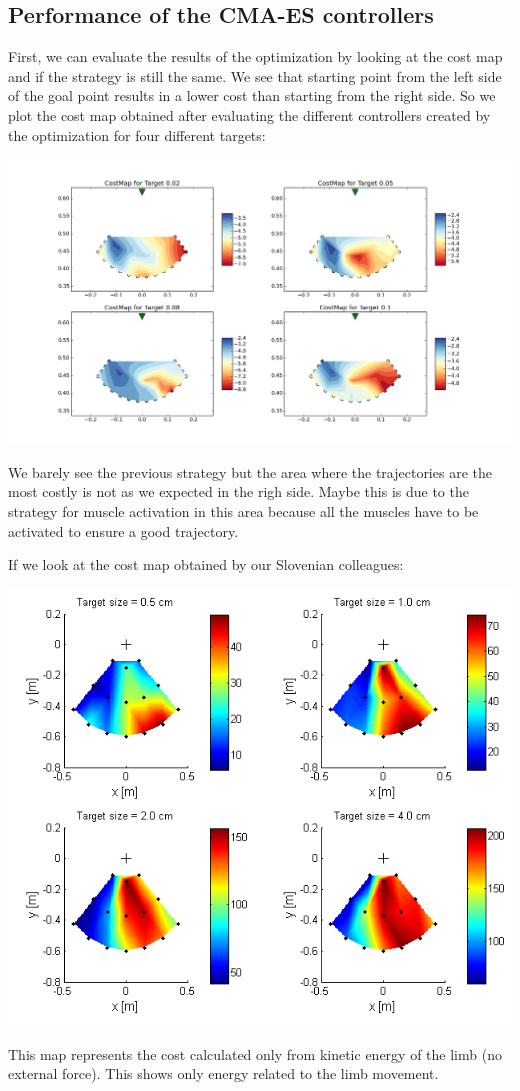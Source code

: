 \documentclass[pdftex,a4paper,12pt]{report}
\begin{document}
\subsection{Performance of the CMA-ES controllers}
First, we can evaluate the results of the optimization by looking at the cost map and if the strategy is still the same. We see that starting point from the left side of the goal point results in a lower cost than starting from the right side.
So we plot the cost map obtained after evaluating the different controllers created by the optimization for four different targets:
\begin{center}
\includegraphics[scale=0.3]{figures/costMapAll.png}
\end{center}
We barely see the previous strategy but the area where the trajectories are the most costly is not as we expected in the righ side.
Maybe this is due to the strategy for muscle activation in this area because all the muscles have to be activated to ensure a good trajectory.

If we look at the cost map obtained by our Slovenian colleagues:
\begin{center}
\includegraphics[scale=0.7]{figures/cost_dyn_no_ext_force.png}
\end{center}
This map represents the cost calculated only from kinetic energy of the limb (no external force). This shows only energy related to the limb movement.
\end{document}
